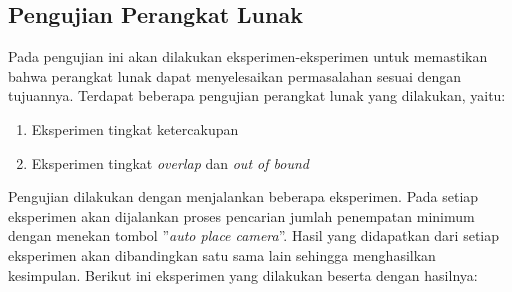 \subsection{Pengujian Perangkat Lunak}

Pada pengujian ini akan dilakukan eksperimen-eksperimen untuk memastikan bahwa perangkat lunak dapat menyelesaikan permasalahan sesuai dengan tujuannya. Terdapat beberapa pengujian perangkat lunak yang dilakukan, yaitu:

\begin{enumerate}
	\item Eksperimen tingkat ketercakupan
	\item Eksperimen tingkat \textit{overlap} dan \textit{out of bound}
\end{enumerate}

Pengujian dilakukan dengan menjalankan beberapa eksperimen. Pada setiap eksperimen akan dijalankan proses pencarian jumlah penempatan minimum dengan menekan tombol ''\textit{auto place camera}''. Hasil yang didapatkan dari setiap eksperimen akan dibandingkan satu sama lain sehingga menghasilkan kesimpulan. Berikut ini eksperimen yang dilakukan beserta dengan hasilnya:

